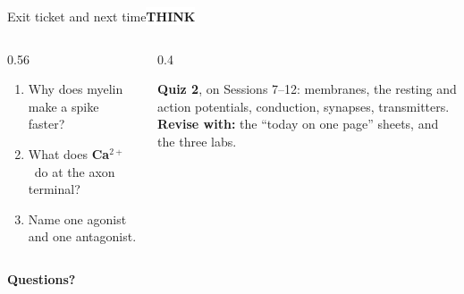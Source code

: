 \documentclass[aspectratio=169,11pt]{beamer}
\newcommand{\tagpill}[3]{{\normalfont\footnotesize\setlength{\fboxsep}{2.5pt}\colorbox{#1}{\textcolor{#2}{\bfseries #3}}}}
\newcommand{\tThink}{\tagpill{white}{kaccent}{THINK}}
\newcommand{\Ca}{\textcolor{cCa}{\textbf{Ca$^{2+}$}}}
\begin{document}
\begin{frame}{Exit ticket and next time}{\tThink}
  \begin{columns}[T]
    \begin{column}{0.56\textwidth}
      \begin{askbox}[title={\bfseries Exit ticket: 3 minutes, booklet page 1}]
        \begin{enumerate}\setlength{\itemsep}{3pt}
          \item Why does myelin make a spike faster?
          \item What does \Ca\ do at the axon terminal?
          \item Name one agonist and one antagonist.
        \end{enumerate}
      \end{askbox}
    \end{column}
    \begin{column}{0.4\textwidth}
      \begin{factbox}[title={Next class}]
        \textbf{Quiz 2}, on Sessions 7--12: membranes, the resting and action potentials, conduction, synapses, transmitters.\\[4pt]
        \textbf{Revise with:} the ``today on one page'' sheets, and the three labs.
      \end{factbox}
    \end{column}
  \end{columns}
  \vspace{0.6em}
  \centering\large\color{kprimary}\textbf{Questions?}
\end{frame}
\end{document}
